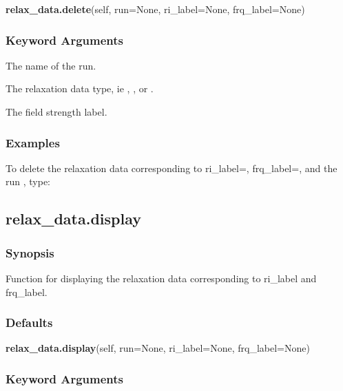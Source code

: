\textsf{\textbf{relax\_data.delete}(self, run=None, ri\_label=None, frq\_label=None)}


\subsubsection{Keyword Arguments}

  The name of the run. 

  The relaxation data type, ie , , or . 

  The field strength label. 




\subsubsection{Examples}

To delete the relaxation data corresponding to ri\_label=, frq\_label=, and the run , type:





\newpage

\subsection{relax\_data.display}


\subsubsection{Synopsis}

Function for displaying the relaxation data corresponding to ri\_label and frq\_label.



\subsubsection{Defaults}

\textsf{\textbf{relax\_data.display}(self, run=None, ri\_label=None, frq\_label=None)}


\subsubsection{Keyword Arguments}

